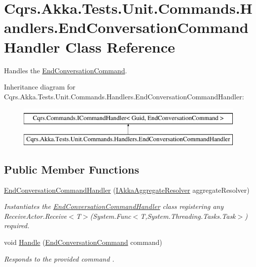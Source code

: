 \hypertarget{classCqrs_1_1Akka_1_1Tests_1_1Unit_1_1Commands_1_1Handlers_1_1EndConversationCommandHandler}{}\section{Cqrs.\+Akka.\+Tests.\+Unit.\+Commands.\+Handlers.\+End\+Conversation\+Command\+Handler Class Reference}
\label{classCqrs_1_1Akka_1_1Tests_1_1Unit_1_1Commands_1_1Handlers_1_1EndConversationCommandHandler}


Handles the \hyperlink{classCqrs_1_1Akka_1_1Tests_1_1Unit_1_1Commands_1_1EndConversationCommand}{End\+Conversation\+Command}.  


Inheritance diagram for Cqrs.\+Akka.\+Tests.\+Unit.\+Commands.\+Handlers.\+End\+Conversation\+Command\+Handler\+:\begin{figure}[H]
\begin{center}
\leavevmode
\includegraphics[height=2.000000cm]{classCqrs_1_1Akka_1_1Tests_1_1Unit_1_1Commands_1_1Handlers_1_1EndConversationCommandHandler}
\end{center}
\end{figure}
\subsection*{Public Member Functions}
\begin{DoxyCompactItemize}
\item 
\hyperlink{classCqrs_1_1Akka_1_1Tests_1_1Unit_1_1Commands_1_1Handlers_1_1EndConversationCommandHandler_aaf3680b69f6cbad95722194c4c16cd1f_aaf3680b69f6cbad95722194c4c16cd1f}{End\+Conversation\+Command\+Handler} (\hyperlink{interfaceCqrs_1_1Akka_1_1Domain_1_1IAkkaAggregateResolver}{I\+Akka\+Aggregate\+Resolver} aggregate\+Resolver)
\begin{DoxyCompactList}\small\item\em Instantiates the \hyperlink{classCqrs_1_1Akka_1_1Tests_1_1Unit_1_1Commands_1_1Handlers_1_1EndConversationCommandHandler}{End\+Conversation\+Command\+Handler} class registering any Receive\+Actor.\+Receive$<$\+T$>$(\+System.\+Func$<$\+T,\+System.\+Threading.\+Tasks.\+Task$>$) required. \end{DoxyCompactList}\item 
void \hyperlink{classCqrs_1_1Akka_1_1Tests_1_1Unit_1_1Commands_1_1Handlers_1_1EndConversationCommandHandler_a45cc1e01d68fb5b241c9e46b333a149e_a45cc1e01d68fb5b241c9e46b333a149e}{Handle} (\hyperlink{classCqrs_1_1Akka_1_1Tests_1_1Unit_1_1Commands_1_1EndConversationCommand}{End\+Conversation\+Command} command)
\begin{DoxyCompactList}\small\item\em Responds to the provided {\itshape command} . \end{DoxyCompactList}\end{DoxyCompactItemize}
